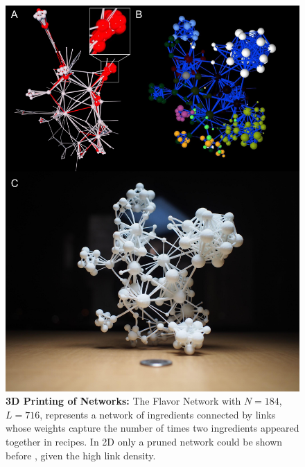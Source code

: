 \documentclass[nofootinbib,preprint,floatfix,titlepage,superscriptaddress]{revtex4} %
\begin{document}
\begin{figure}
    \centering
    \vspace{-2cm}
    \includegraphics[height=\textheight]{fig-09-19/3D-flavor-111917-1-4.pdf}
    \caption{\scriptsize {\bf 3D Printing of Networks:}
    The Flavor Network with $N=184$, $L=716$, represents a network of ingredients connected by links whose weights capture the number of times two ingredients appeared together in recipes. 
    In 2D only a pruned network could be shown before \cite{ahn2011flavor}, given the high link density.
}
\end{figure}
\end{document}
